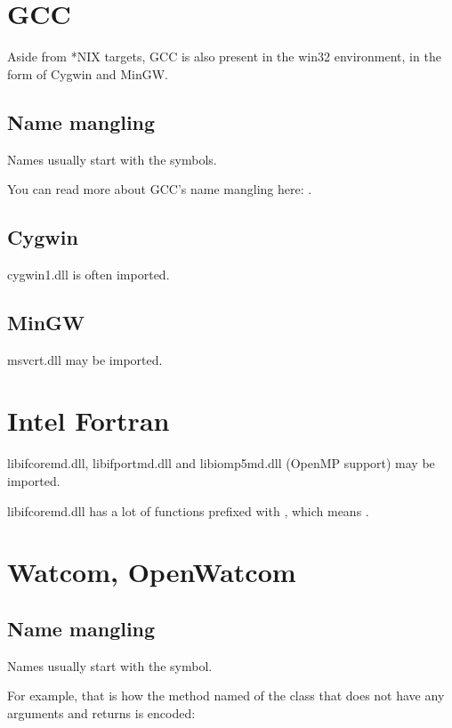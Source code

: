 \section{GCC}

Aside from *NIX targets, GCC is also present in the win32 environment, in the form of Cygwin and MinGW.

\subsection{Name mangling}

Names usually start with the  symbols.

You can read more about GCC's \gls{name mangling} here: .

\subsection{Cygwin}

cygwin1.dll is often imported.

\subsection{MinGW}

msvcrt.dll may be imported.

\section{Intel Fortran}

libifcoremd.dll, libifportmd.dll and libiomp5md.dll (OpenMP support) may be imported.

libifcoremd.dll has a lot of functions prefixed with , which means .

\section{Watcom, OpenWatcom}

\subsection{Name mangling}

Names usually start with the  symbol.

For example, that is how the method named  of the class  that does not have any arguments and returns
\Tvoid is encoded:

